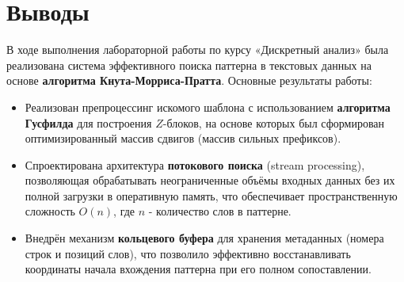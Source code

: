 \section{Выводы}В ходе выполнения лабораторной работы по курсу «Дискретный анализ» была реализована система эффективного поиска паттерна в текстовых данных на основе \textbf{алгоритма Кнута-Морриса-Пратта}.
Основные результаты работы:
\begin{itemize}
    \item Реализован препроцессинг искомого шаблона с использованием \textbf{алгоритма Гусфилда} для построения $Z$-блоков, на основе которых был сформирован оптимизированный массив сдвигов (массив сильных префиксов).
    \item Спроектирована архитектура \textbf{потокового поиска} (stream processing), позволяющая обрабатывать неограниченные объёмы входных данных без их полной загрузки в оперативную память, что обеспечивает пространственную сложность $O(n)$, где $n$ - количество слов в паттерне.
    \item Внедрён механизм \textbf{кольцевого буфера} для хранения метаданных (номера строк и позиций слов), что позволило эффективно восстанавливать координаты начала вхождения паттерна при его полном сопоставлении.
\end{itemize}